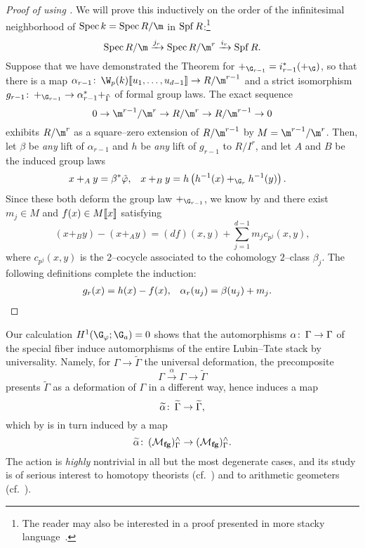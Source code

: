 \begin{proof}[{Proof of  using }]
We will prove this inductively on the order of the infinitesimal neighborhood of \(\Spec k = \Spec R / \m\) in \(\operatorname{Spf} R\):\footnote{The reader may also be interested in a proof presented in more stacky language~\cite[Reduction to Theorem 21.5]{LurieChromaticCourseNotes}.} \[\Spec R / \m \xrightarrow{j_r} \Spec R/\m^r \xrightarrow{i_r} \Spf R.\]  Suppose that we have demonstrated the Theorem for \(+_{\G_{r-1}} = i_{r-1}^* (+_{\G})\), so that there is a map \(\alpha_{r-1}\co \W_p(k)\ps{u_1, \ldots, u_{d-1}} \to R/\m^{r-1}\) and a strict isomorphism \(g_{r-1}\co +_{\G_{r-1}} \to \alpha_{r-1}^* +_{\tilde \Gamma}\) of formal group laws.  The exact sequence \[0 \to \m^{r-1} / \m^r \to R/\m^r \to R/\m^{r-1} \to 0\] exhibits \(R/\m^r\) as a square--zero extension of \(R/\m^{r-1}\) by \(M = \m^{r-1} / \m^r\).  Then, let \(\beta\) be \emph{any} lift of \(\alpha_{r-1}\) and \(h\) be \emph{any} lift of \(g_{r-1}\) to \(R/I^r\), and let \(A\) and \(B\) be the induced group laws
\begin{align*}
x +_A y & = \beta^* \tilde \phi, &
x +_B y & = h\left( h^{-1}(x) +_{\G_r} h^{-1}(y) \right).
\end{align*}
Since these both deform the group law \(+_{\G_{r-1}}\), we know by  and  there exist \(m_j \in M\) and \(f(x) \in M\llbracket{x}\rrbracket\) satisfying \[(x +_B y) - (x +_A y) = (df)(x, y) + \sum_{j=1}^{d-1} m_j c_{p^j}(x, y),\] where \(c_{p^j}(x, y)\) is the \(2\)--cocycle associated to the cohomology \(2\)--class \(\beta_j\).  The following definitions complete the induction:
\begin{align*}
g_r(x) & = h(x) - f(x), &
\alpha_r(u_j) & = \beta(u_j) + m_j. \qedhere
\end{align*}
\end{proof}

\begin{remark}\label{ActionBySnLiftsToLTn}
Our calculation \(H^1(\G_\phi; \G_a) = 0\) shows that the automorphisms \(\alpha\colon\thinspace \Gamma \to \Gamma\) of the special fiber induce automorphisms of the entire Lubin--Tate stack by universality.  Namely, for \(\Gamma \to \widetilde \Gamma\) the universal deformation, the precomposite \[\Gamma \xrightarrow{\alpha} \Gamma \to \widetilde \Gamma\] presents \(\widetilde \Gamma\) as a deformation of \(\Gamma\) in a different way, hence induces a map \[\widetilde \alpha\colon\thinspace \widetilde \Gamma \to \widetilde \Gamma,\] which by  is in turn induced by a map \[\widetilde \alpha\colon\thinspace (\mathcal{M}_{\mathbf{fg}})^\wedge_\Gamma \to (\mathcal{M}_{\mathbf{fg}})^\wedge_\Gamma.\]  The action is \emph{highly} nontrivial in all but the most degenerate cases, and its study is of serious interest to homotopy theorists (cf.\ ) and to arithmetic geometers (cf.\ ).
\end{remark}

